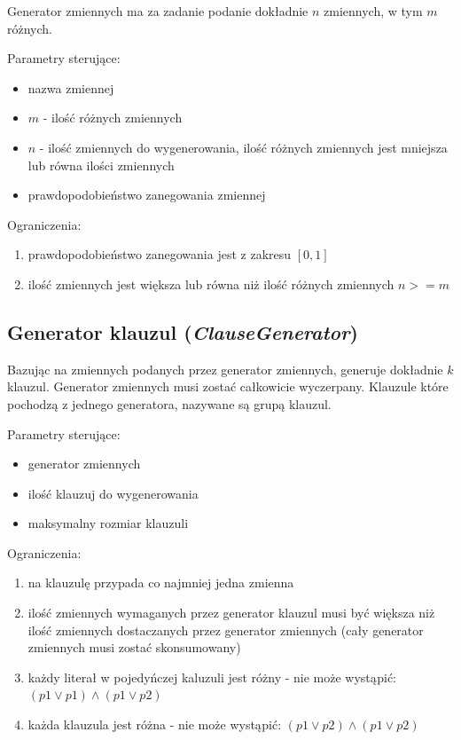 \documentclass[a4paper,12pt]{article}
\begin{document}
Generator zmiennych ma za zadanie podanie dokładnie $n$ zmiennych, w tym $m$ różnych.

\noindent
Parametry sterujące:

\begin{itemize}
  \item nazwa zmiennej
  \item $m$ - ilość różnych zmiennych
  \item $n$ - ilość zmiennych do wygenerowania, ilość różnych zmiennych jest mniejsza lub równa ilości zmiennych
  \item prawdopodobieństwo zanegowania zmiennej
\end{itemize}

\noindent
Ograniczenia:
\begin{enumerate}
  \item prawdopodobieństwo zanegowania jest z zakresu $[0,1]$
  \item ilość zmiennych jest większa lub równa niż ilość różnych zmiennych $n>=m$
\end{enumerate}

\subsection{Generator klauzul (\textit{ClauseGenerator})} \label{ClauseGenerator}

Bazując na zmiennych podanych przez generator zmiennych, generuje dokładnie $k$ klauzul. Generator zmiennych musi zostać całkowicie wyczerpany. Klauzule które pochodzą z jednego generatora, nazywane są grupą klauzul.

\noindent
Parametry sterujące:
\begin{itemize}
  \item generator zmiennych
  \item ilość klauzuj do wygenerowania
  \item maksymalny rozmiar klauzuli
\end{itemize}

\noindent
Ograniczenia:
\begin{enumerate}
  \item na klauzulę przypada co najmniej jedna zmienna
  \item ilość zmiennych wymaganych przez generator klauzul musi być większa niż ilość zmiennych dostaczanych przez generator zmiennych (cały generator zmiennych musi zostać skonsumowany)
  \item każdy literał w pojedyńczej kaluzuli jest różny - nie może wystąpić: $(p1 \lor p1) \land (p1 \lor p2)$
  \item każda klauzula jest różna - nie może wystąpić: $(p1 \lor p2) \land (p1 \lor p2)$
\end{enumerate}
\end{document}
